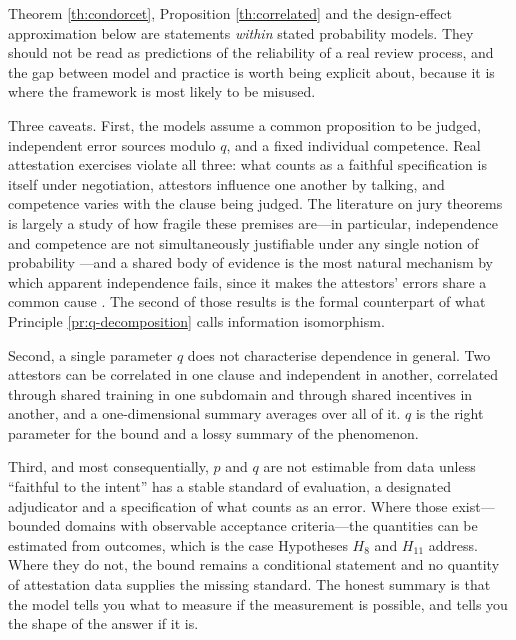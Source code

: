 \begin{remark}\label{rmk:consensus-status}
Theorem \ref{th:condorcet}, Proposition \ref{th:correlated} and the design-effect approximation
below are statements \emph{within} stated probability models. They should not be read as predictions
of the reliability of a real review process, and the gap between model and practice is worth being
explicit about, because it is where the framework is most likely to be misused.

Three caveats. First, the models assume a common proposition to be judged, independent error sources
modulo $q$, and a fixed individual competence. Real attestation exercises violate all three: what
counts as a faithful specification is itself under negotiation, attestors influence one another by
talking, and competence varies with the clause being judged. The literature on jury theorems is
largely a study of how fragile these premises are---in particular, independence and competence are
not simultaneously justifiable under any single notion of probability \cite{dietrich2008}---and a
shared body of evidence is the most natural mechanism by which apparent independence fails, since it
makes the attestors' errors share a common cause \cite{dietrich2004}. The second of those results is
the formal counterpart of what Principle \ref{pr:q-decomposition} calls information isomorphism.

Second, a single parameter $q$ does not characterise dependence in general. Two attestors can be
correlated in one clause and independent in another, correlated through shared training in one
subdomain and through shared incentives in another, and a one-dimensional summary averages over all
of it. $q$ is the right parameter for the bound and a lossy summary of the phenomenon.

Third, and most consequentially, $p$ and $q$ are not estimable from data unless ``faithful to the
intent'' has a stable standard of evaluation, a designated adjudicator and a specification of what
counts as an error. Where those exist---bounded domains with observable acceptance criteria---the
quantities can be estimated from outcomes, which is the case Hypotheses $H_8$ and $H_{11}$ address.
Where they do not, the bound remains a conditional statement and no quantity of attestation data
supplies the missing standard. The honest summary is that the model tells you what to measure if the
measurement is possible, and tells you the shape of the answer if it is.
\end{remark}

